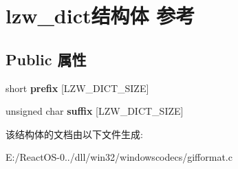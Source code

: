 \hypertarget{structlzw__dict}{}\section{lzw\+\_\+dict结构体 参考}
\label{structlzw__dict}
\subsection*{Public 属性}
\begin{DoxyCompactItemize}
\item 
\mbox{\label{structlzw__dict_aafec8957a957a80396c6a0bd4b89092a}} 
short {\bfseries prefix} \mbox{[}L\+Z\+W\+\_\+\+D\+I\+C\+T\+\_\+\+S\+I\+ZE\mbox{]}
\item 
\mbox{\label{structlzw__dict_ace8734f3eadbf0f66e02d0c839de260c}} 
unsigned char {\bfseries suffix} \mbox{[}L\+Z\+W\+\_\+\+D\+I\+C\+T\+\_\+\+S\+I\+ZE\mbox{]}
\end{DoxyCompactItemize}


该结构体的文档由以下文件生成\+:\begin{DoxyCompactItemize}
\item 
E\+:/\+React\+O\+S-\/0../dll/win32/windowscodecs/gifformat.\+c\end{DoxyCompactItemize}
